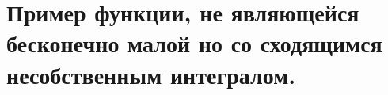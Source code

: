 \documentclass[../main.tex]{subfiles}
\begin{document}
\newpage
\section{Пример функции, не являющейся бесконечно малой но со сходящимся несобственным интегралом.}
\end{document}
